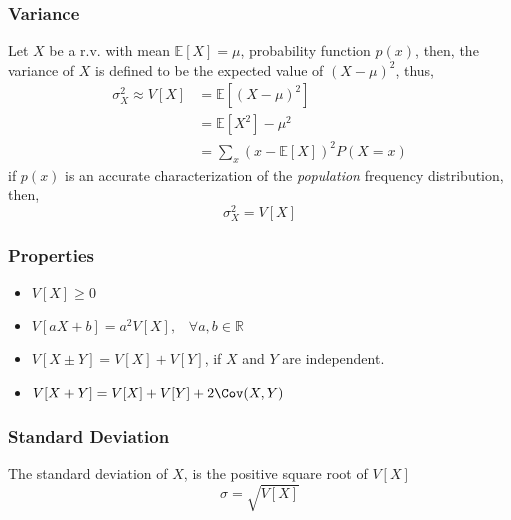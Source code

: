 \subsubsection{Variance} %
\label{ssub:variance}

Let $X$ be a r.v. with mean $\mathbb{E}[X] = \mu$, probability function $p(x)$,
then, the variance of $X$ is defined to be the expected value of $(X-\mu)^2$,
thus,
\begin{equation*}
    \begin{split}
        \sigma^2_X \approx V[X] &= \mathbb{E}[(X-\mu)^2] \\
                                &= \mathbb{E}[X^2] - \mu^2 \\
                                &=\sum_{x}(x-\mathbb{E}[X])^2 P(X=x)
    \end{split}
\end{equation*}
if $p(x)$ is an accurate characterization of the \emph{population} frequency
distribution, then,
\begin{equation*}
    \sigma^2_{X} = V[X]
\end{equation*}

\subsubsection{Properties} %
\label{ssub:properties04}

\begin{itemize}
    \item $V[X] \geq 0$
    \item $V[aX + b] = a^2V[X], \;\;\; \forall a,b \in \mathbb{R}$
    \item $V[X \pm Y] = V[X] + V[Y]$, if $X$ and $Y$ are independent.
    \item $V[X + Y] = V[X] + V[Y] + 2 \Cov(X,Y)$
\end{itemize}

\subsubsection{Standard Deviation} %
\label{ssub:standard_deviation}

The standard deviation of $X$, is the positive square root of $V[X]$
\begin{equation*}
    \sigma = \sqrt{V[X]}
\end{equation*}

